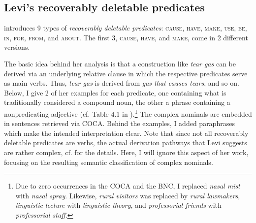 \subsection{Levi's recoverably deletable predicates }
\label{sec:levi_predicates_overview}

\citet[75--80]{Levi:1978} introduces 9 types of \emph{recoverably deletable predicates}:
\textsc{cause}, \textsc{have}, \textsc{make}, \textsc{use}, \textsc{be},
\textsc{in}, \textsc{for}, \textsc{from}, and \textsc{about}. The first 3,
\textsc{cause}, \textsc{have}, and \textsc{make}, come in 2 different
versions.

The basic idea behind her analysis is that a construction like \emph{tear gas}
can be derived via an underlying relative clause in which the respective
predicates serve as main verbs. Thus, \emph{tear gas} is derived
from \emph{gas that causes tears}, and so on. Below, I give 2 of her examples
for each predicate, one containing what is traditionally considered a compound
noun, the other a phrase containing a nonpredicating adjective (cf. Table
4.1 in \citealt[76--77]{Levi:1978}).\footnote{Due to zero occurrences in the
  COCA and the BNC, I replaced \emph{nasal mist} with \emph{nasal spray}. Likewise,
  \emph{rural visitors} was replaced by \emph{rural
    lawmakers}, \emph{linguistic lecture} with \emph{linguistic theory}, and
  \emph{professorial friends} with \emph{professorial staff}.} The complex nominals
are embedded in sentences retrieved via COCA. Behind the examples, I added paraphrases
which make the intended interpretation clear. Note that since not
all recoverably deletable predicates are verbs, the actual derivation
pathways that Levi suggests are rather complex, cf. \citet[4.2,
Derivations][118--153]{Levi:1978} for the details. Here, I will ignore
this aspect of her work, focusing on the resulting semantic
classification of complex nominals. 

